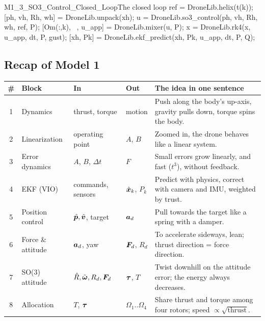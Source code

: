 \begin{toycode}{M1\_3\_SO3\_Control\_Closed\_Loop}{The closed loop}
ref = DroneLib.helix(t(k));                                   %
[ph, vh, Rh, wh] = DroneLib.unpack(xh);                       %
u = DroneLib.so3_control(ph, vh, Rh, wh, ref, P);             %
[Om(:,k), ~, u_app] = DroneLib.mixer(u, P);                   %
x  = DroneLib.rk4(x, u_app, dt, P, gust);                     %
[xh, Pk] = DroneLib.ekf_predict(xh, Pk, u_app, dt, P, Q);     %
\end{toycode}

\subsection*{Recap of Model 1}
\begin{center}\small
\begin{tabularx}{\linewidth}{@{}c >{\raggedright\arraybackslash}p{2.8cm} >{\raggedright\arraybackslash}p{2.9cm} >{\raggedright\arraybackslash}p{2.4cm} X@{}}
\toprule
\textbf{\#} & \textbf{Block} & \textbf{In} & \textbf{Out} & \textbf{The idea in one sentence}\\
\midrule
1 & Dynamics & thrust, torque & motion & Push along the body's up-axis, gravity pulls down, torque spins the body.\\
2 & Linearization & operating point & $A$, $B$ & Zoomed in, the drone behaves like a linear system.\\
3 & Error dynamics & $A$, $B$, $\Delta t$ & $F$ & Small errors grow linearly, and fast ($t^3$), without feedback.\\
4 & EKF (VIO) & commands, sensors & $\hat{\bm x}_k$, $P_k$ & Predict with physics, correct with camera and IMU, weighted by trust.\\
5 & Position control & $\hat{\bm p},\hat{\bm v}$, target & $\bm{a}_d$ & Pull towards the target like a spring with a damper.\\
6 & Force \& attitude & $\bm{a}_d$, yaw & $\bm{F}_d$, $R_d$ & To accelerate sideways, lean; thrust direction = force direction.\\
7 & SO(3) attitude & $\hat{R},\hat{\bm\omega},R_d,\bm{F}_d$ & $\bm{\tau}$, $T$ & Twist downhill on the attitude error; the energy always decreases.\\
8 & Allocation & $T$, $\bm{\tau}$ & $\Omega_1..\Omega_4$ & Share thrust and torque among four rotors; speed $\propto\sqrt{\text{thrust}}$.\\
\bottomrule
\end{tabularx}
\end{center}
